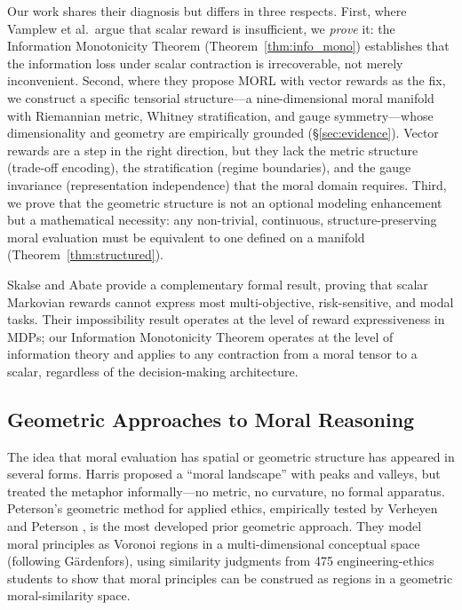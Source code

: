 \documentclass[12pt,letterpaper]{article}
\theoremstyle{definition}
\theoremstyle{remark}
\begin{document}
Our work shares their diagnosis but differs in three respects. First, where Vamplew et al.\ argue that scalar reward is insufficient, we \emph{prove} it: the Information Monotonicity Theorem (Theorem~\ref{thm:info_mono}) establishes that the information loss under scalar contraction is irrecoverable, not merely inconvenient. Second, where they propose MORL with vector rewards as the fix, we construct a specific tensorial structure---a nine-dimensional moral manifold with Riemannian metric, Whitney stratification, and gauge symmetry---whose dimensionality and geometry are empirically grounded (\S\ref{sec:evidence}). Vector rewards are a step in the right direction, but they lack the metric structure (trade-off encoding), the stratification (regime boundaries), and the gauge invariance (representation independence) that the moral domain requires. Third, we prove that the geometric structure is not an optional modeling enhancement but a mathematical necessity: any non-trivial, continuous, structure-preserving moral evaluation must be equivalent to one defined on a manifold (Theorem~\ref{thm:structured}).

Skalse and Abate \cite{skalse2023} provide a complementary formal result, proving that scalar Markovian rewards cannot express most multi-objective, risk-sensitive, and modal tasks. Their impossibility result operates at the level of reward expressiveness in MDPs; our Information Monotonicity Theorem operates at the level of information theory and applies to any contraction from a moral tensor to a scalar, regardless of the decision-making architecture.

\subsection{Geometric Approaches to Moral Reasoning}

The idea that moral evaluation has spatial or geometric structure has appeared in several forms. Harris \cite{harris2010} proposed a ``moral landscape'' with peaks and valleys, but treated the metaphor informally---no metric, no curvature, no formal apparatus. Peterson's geometric method for applied ethics, empirically tested by Verheyen and Peterson \cite{verheyen2020}, is the most developed prior geometric approach. They model moral principles as Voronoi regions in a multi-dimensional conceptual space (following G\"{a}rdenfors), using similarity judgments from 475 engineering-ethics students to show that moral principles can be construed as regions in a geometric moral-similarity space.
\end{document}
